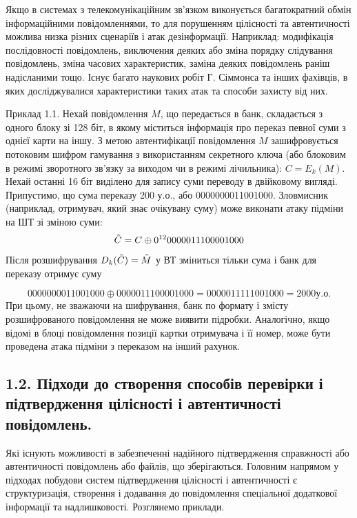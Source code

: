 Якщо в системах з телекомунікаційним зв’язком виконується багатократний
обмін інформаційними повідомленнями, то для порушенням цілісності та
автентичності можлива низка різних сценаріїв і атак дезінформації. Наприклад:
модифікація послідовності повідомлень, виключення деяких або зміна порядку
слідування повідомлень, зміна часових характеристик, заміна деяких повідомлень
раніш надісланими тощо. Існує багато наукових робіт Г. Сіммонса та інших
фахівців, в яких досліджувалися характеристики таких атак та способи захисту від
них.

\begin{example}
    Приклад 1.1. Нехай повідомлення $M$, що передається в банк, складається з
    одного блоку зі 128 біт, в якому міститься інформація про переказ певної суми з
    однієї карти на іншу. З метою автентифікації повідомлення $M$ зашифровується
    потоковим шифром гамування з використанням секретного ключа (або блоковим
    в режимі зворотного зв’язку за виходом чи в режимі лічильника): $C = E_k(M)$.
    Нехай останні 16 біт виділено для запису суми переводу в двійковому вигляді.
    Припустимо, що сума переказу 200 у.о., або 0000000011001000. Зловмисник
    (наприклад, отримувач, який знає очікувану суму) може виконати атаку підміни
    на ШТ зі зміною суми:
    $$\Tilde{C} = C \oplus 0^{12}0000011100001000$$
    Після розшифрування $D_k(\Tilde{C}) = \Tilde{M}$ у ВТ зміниться тільки сума і банк
    для переказу отримує суму
    
    $$0000000011001000 \oplus 0000011100001000 = 0000011111001000 =
    2000 \text{у.о.}$$
    При цьому, не зважаючи на шифрування, банк по формату і змісту
    розшифрованого повідомлення не може виявити підробки. Аналогічно, якщо
    відомі в блоці повідомлення позиції картки отримувача і її номер, може бути
    проведена атака підміни з переказом на інший рахунок.
\end{example}

\subsection{1.2. Підходи до створення способів перевірки і підтвердження цілісності і автентичності повідомлень.}

Які існують можливості в забезпеченні надійного підтвердження
справжності або автентичності повідомлень або файлів, що зберігаються.
Головним напрямом у підходах побудови систем підтвердження цілісності і
автентичності є структуризація, створення і додавання до повідомлення
спеціальної додаткової інформації та надлишковості. Розглянемо приклади.

